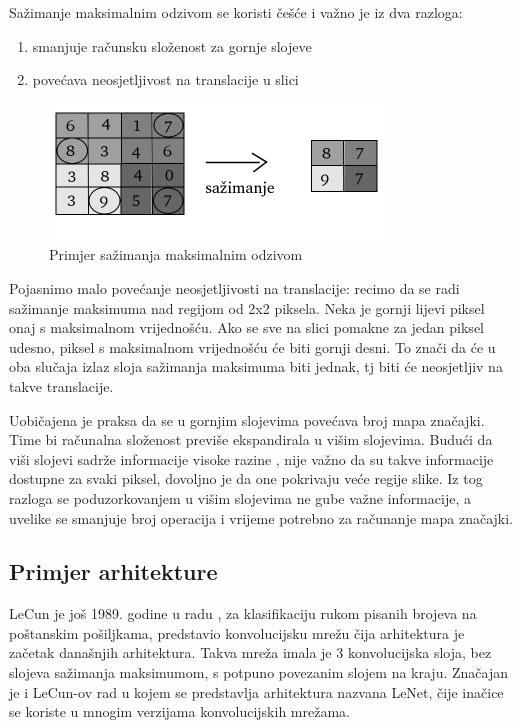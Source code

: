 \documentclass[times, utf8, diplomski, numeric]{fer}
\begin{document}
Sažimanje maksimalnim odzivom se koristi češće i važno je iz dva razloga:
\begin{enumerate}
    \item smanjuje računsku složenost za gornje slojeve
    \item povećava neosjetljivost na translacije u slici
\end{enumerate}

\begin{figure}[htb]
\centering
\includegraphics{imgs/max-pooling.png}
\caption{Primjer sažimanja maksimalnim odzivom}
\label{fig:max_pooling}
\end{figure}

Pojasnimo malo povećanje neosjetljivosti na translacije: recimo da se radi sažimanje maksimuma nad regijom od 2x2 piksela. Neka je gornji lijevi piksel onaj s maksimalnom vrijednošću. Ako se sve na slici pomakne za jedan piksel udesno, piksel s maksimalnom vrijednošću će biti gornji desni. To znači da će u oba slučaja izlaz sloja sažimanja maksimuma biti jednak, tj biti će neosjetljiv na takve translacije.

Uobičajena je praksa da se u gornjim slojevima povećava broj mapa značajki. Time bi računalna složenost previše ekspandirala u višim slojevima. Budući da viši slojevi sadrže informacije visoke razine , nije važno da su takve informacije dostupne za svaki piksel, dovoljno je da one pokrivaju veće regije slike. Iz tog razloga se poduzorkovanjem u višim slojevima ne gube važne informacije, a uvelike se smanjuje broj operacija i vrijeme potrebno za računanje mapa značajki.

\subsection{Primjer arhitekture}

LeCun je još 1989. godine u radu \cite{lecun-98b}, za klasifikaciju rukom pisanih brojeva na poštanskim pošiljkama, predstavio konvolucijsku mrežu čija arhitektura je začetak današnjih arhitektura. Takva mreža imala je 3 konvolucijska sloja, bez slojeva sažimanja maksimumom, s potpuno povezanim slojem na kraju. Značajan je i LeCun-ov rad \cite{gradient_document} u kojem se predstavlja arhitektura nazvana LeNet, čije inačice se koriste u mnogim verzijama konvolucijskih mrežama.
\end{document}

